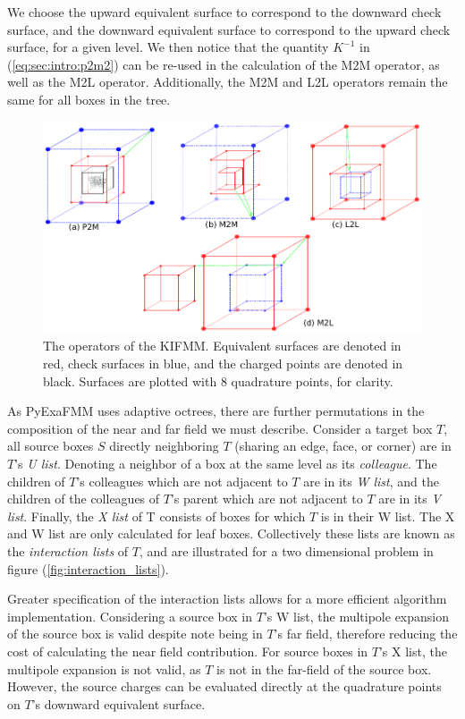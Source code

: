 \documentclass{IEEEcsmag}
\begin{document}
We choose the upward equivalent surface to correspond to the downward check surface, and the downward equivalent surface to correspond to the upward check surface, for a given level. We then notice that the quantity $K^{-1}$ in (\ref{eq:sec:intro:p2m2}) can be re-used in the calculation of the M2M operator, as well as the M2L operator. Additionally, the M2M and L2L operators remain the same for all boxes in the tree.

\begin{figure}
	\centerline{\includegraphics {figures/operators.pdf}}
	\caption{The operators of the KIFMM. Equivalent surfaces are denoted in red, check surfaces in blue, and the charged points are denoted in black. Surfaces are plotted with 8 quadrature points, for clarity.}
	\label{fig:operators}
\end{figure}

As PyExaFMM uses adaptive octrees, there are further permutations in the composition of the near and far field we must describe. Consider a target box $T$, all source boxes $S$ directly neighboring $T$ (sharing an edge, face, or corner) are in $T$'s \textit{U list}. Denoting a neighbor of a box at the same level as its \textit{colleague}. The children of $T$'s colleagues which are not adjacent to $T$ are in its \textit{W list}, and the children of the colleagues of $T$'s parent which are not adjacent to $T$ are in its \textit{V list}. Finally, the \textit{X list} of T consists of boxes for which $T$ is in their W list. The X and W list are only calculated for leaf boxes. Collectively these lists are known as the \textit{interaction lists} of $T$, and are illustrated for a two dimensional problem in figure (\ref{fig:interaction_lists}).

Greater specification of the interaction lists allows for a more efficient algorithm implementation. Considering a source box in $T$'s W list, the multipole expansion of the source box is valid despite note being in $T$'s far field, therefore reducing the cost of calculating the near field contribution. For source boxes in $T$'s X list, the multipole expansion is not valid, as $T$ is not in the far-field of the source box. However, the source charges can be evaluated directly at the quadrature points on $T$'s downward equivalent surface.
\end{document}
